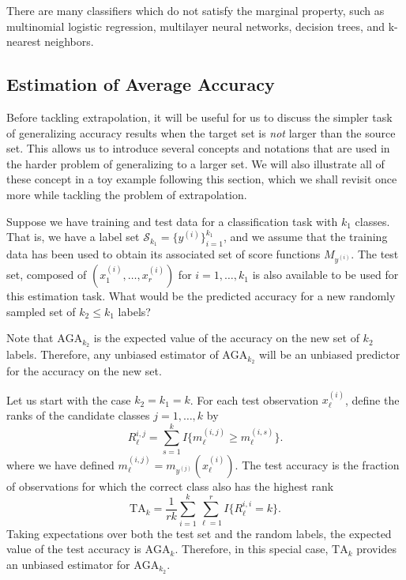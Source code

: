 \documentclass[twoside,11pt]{article}
\begin{document}
There are many classifiers which do not satisfy the marginal
  property, such as multinomial logistic regression, multilayer neural
  networks, decision trees, and k-nearest neighbors.



\subsection{Estimation of Average Accuracy}\label{sec:estimation_average_accuracy}

Before tackling extrapolation, it will be useful for us to discuss the simpler task of generalizing accuracy results when the target set is \emph{not} larger than the source set.
This allows us to introduce several concepts and notations that are used in the harder problem
of generalizing to a larger set.  We will also illustrate all of these concept in a toy example following this section, which we shall revisit once more while tackling the problem of extrapolation.

Suppose we have training and test data for a classification task with $k_1$
classes.
That is, we have a label set $\mathcal{S}_{k_1} =
\{y^{(i)}\}_{i=1}^{k_1}$, and
we assume that the training data has been used to obtain its associated set of score functions
$M_{y^{(i)}}$.
The test set, composed of $(x_1^{(i)},\hdots,
x_{r}^{(i)})$ for $i = 1,\hdots, k_1$ is also available to be used for this estimation task.
What would be the predicted
accuracy for a new randomly sampled set of $k_2 \leq k_1$ labels?

Note that $\text{AGA}_{k_2}$ is the expected value of the accuracy on
the new set of $k_2$ labels.  Therefore, any unbiased estimator of
$\text{AGA}_{k_2}$ will be an unbiased predictor for the accuracy on
the new set.

Let us start with the case $k_2 = k_1 = k$.  For each test observation
$x_\ell^{(i)}$, define the ranks of the candidate classes $j =
1,\hdots, k$ by
\[
R_{\ell}^{i, j} = \sum_{s = 1}^k I\{m^{(i,j)}_\ell \geq m^{(i,s)}_\ell\}.
\]
where we have defined $m^{(i, j)}_\ell = m_{y^{(j)}}(x_\ell^{(i)})$.
The test accuracy is the fraction of observations for which the
correct class also has the highest rank
\begin{equation}\label{eq:test_risk}
\text{TA}_k = \frac{1}{r k} \sum_{i=1}^{k} \sum_{\ell=1}^{r} I\{R_\ell^{i,i} = k\}.
\end{equation}
Taking expectations over both the test set and the random labels, the
expected value of the test accuracy is $\text{AGA}_k$.  Therefore, in this special case, $\text{TA}_k$ provides an unbiased estimator for $\text{AGA}_{k_2}$.
\end{document}
